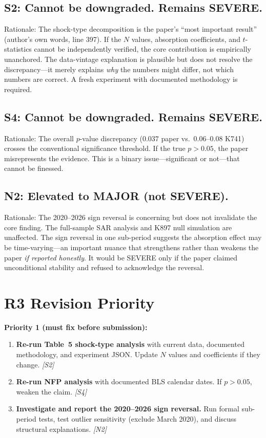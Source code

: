 \documentclass[12pt,a4paper]{article}
\begin{document}
\subsection*{S2: Cannot be downgraded. Remains SEVERE.}

Rationale: The shock-type decomposition is the paper's ``most important result'' (author's own words, line 397). If the $N$ values, absorption coefficients, and $t$-statistics cannot be independently verified, the core contribution is empirically unanchored. The data-vintage explanation is plausible but does not resolve the discrepancy---it merely explains \textit{why} the numbers might differ, not which numbers are correct. A fresh experiment with documented methodology is required.

\subsection*{S4: Cannot be downgraded. Remains SEVERE.}

Rationale: The overall $p$-value discrepancy ($0.037$ paper vs.\ $0.06$--$0.08$ K741) crosses the conventional significance threshold. If the true $p > 0.05$, the paper misrepresents the evidence. This is a binary issue---significant or not---that cannot be finessed.

\subsection*{N2: Elevated to MAJOR (not SEVERE).}

Rationale: The 2020--2026 sign reversal is concerning but does not invalidate the core finding. The full-sample SAR analysis and K897 null simulation are unaffected. The sign reversal in one sub-period suggests the absorption effect may be time-varying---an important nuance that strengthens rather than weakens the paper \textit{if reported honestly}. It would be SEVERE only if the paper claimed unconditional stability and refused to acknowledge the reversal.


\bigskip

\section*{R3 Revision Priority}

\textbf{Priority 1 (must fix before submission):}
\begin{enumerate}
\item \textbf{Re-run Table~5 shock-type analysis} with current data, documented methodology, and experiment JSON. Update $N$ values and coefficients if they change. \textit{[S2]}
\item \textbf{Re-run NFP analysis} with documented BLS calendar dates. If $p > 0.05$, weaken the claim. \textit{[S4]}
\item \textbf{Investigate and report the 2020--2026 sign reversal.} Run formal sub-period tests, test outlier sensitivity (exclude March 2020), and discuss structural explanations. \textit{[N2]}
\end{enumerate}
\end{document}
